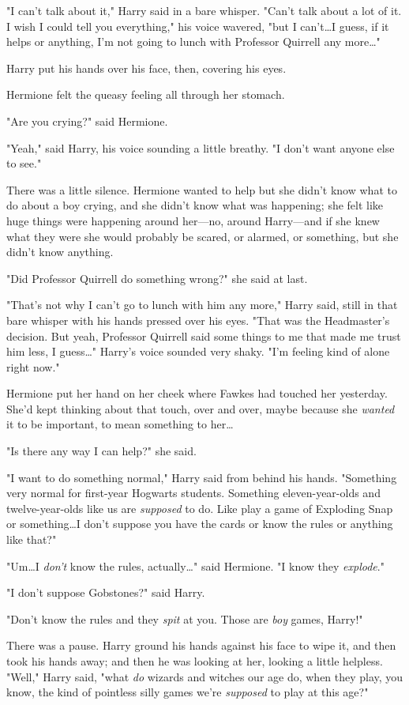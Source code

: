 "I can't talk about it," Harry said in a bare whisper. "Can't talk about a lot
of it. I wish I could tell you everything," his voice wavered, "but I
can't…I guess, if it helps or anything, I'm not going to lunch with
Professor Quirrell any more…"

Harry put his hands over his face, then, covering his eyes.

Hermione felt the queasy feeling all through her stomach.

"Are you crying?" said Hermione.

"Yeah," said Harry, his voice sounding a little breathy. "I don't want anyone
else to see."

There was a little silence. Hermione wanted to help but she didn't know what to
do about a boy crying, and she didn't know what was happening; she felt like
huge things were happening around her—no, around Harry—and if she knew what
they were she would probably be scared, or alarmed, or something, but she
didn't know anything.

"Did Professor Quirrell do something wrong?" she said at last.

"That's not why I can't go to lunch with him any more," Harry said, still in
that bare whisper with his hands pressed over his eyes. "That was the
Headmaster's decision. But yeah, Professor Quirrell said some things to me that
made me trust him less, I guess…" Harry's voice sounded very shaky. "I'm
feeling kind of alone right now."

Hermione put her hand on her cheek where Fawkes had touched her yesterday.
She'd kept thinking about that touch, over and over, maybe because she
\emph{wanted} it to be important, to mean something to her…

"Is there any way I can help?" she said.

"I want to do something normal," Harry said from behind his hands. "Something
very normal for first-year Hogwarts students. Something eleven-year-olds and
twelve-year-olds like us are \emph{supposed} to do. Like play a game of
Exploding Snap or something…I don't suppose you have the cards or know
the rules or anything like that?"

"Um…I \emph{don't} know the rules, actually…" said Hermione. "I
know they \emph{explode}."

"I don't suppose Gobstones?" said Harry.

"Don't know the rules and they \emph{spit} at you. Those are \emph{boy} games,
Harry!"

There was a pause. Harry ground his hands against his face to wipe it, and then
took his hands away; and then he was looking at her, looking a little helpless.
"Well," Harry said, "what \emph{do} wizards and witches our age do, when they
play, you know, the kind of pointless silly games we're \emph{supposed} to play
at this age?"

